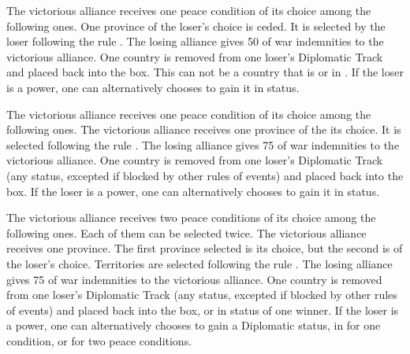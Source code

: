 \bparag The victorious alliance receives one peace condition of its choice
among the following ones.
 One province of the loser's choice is ceded.  It
is selected by the loser following the rule .
\bparag[Indemnities]
The losing alliance gives 50 \ducats of war indemnities to the victorious
alliance.
One country is removed from one loser's Diplomatic Track and placed back into
the \Neutral box. This can not be a country that is \VASSAL or in \ANNEXION.
If the loser is a \MIN power, one can alternatively chooses to gain it in \MR
status.

\bparag The victorious alliance receives one peace condition of its choice
among the following ones.
 The victorious alliance receives one province of
the its choice. It is selected following the rule .
\bparag[Indemnities]
The losing alliance gives 75 \ducats of war indemnities to the victorious
alliance.
One country is removed from one loser's Diplomatic Track (any status, excepted
if blocked by other rules of events) and placed back into the \Neutral box.
If the loser is a \MIN power, one can alternatively chooses to gain it in \MR
status.

\bparag The victorious alliance receives two peace conditions of its choice
among the following ones. Each of them can be selected twice.
 The victorious alliance receives one province.
The first province selected is its choice, but the second is of the loser's
choice.  Territories are selected following the rule
.
\bparag[Indemnities]
The losing alliance gives 75 \ducats of war indemnities to the victorious
alliance.
One country is removed from one loser's Diplomatic Track (any status, excepted
if blocked by other rules of events) and placed back into the \Neutral box, or
in \MR status of one winner.  If the loser is a \MIN power, one can
alternatively chooses to gain a Diplomatic status, in \MR for one condition,
or \AM for two peace conditions.

